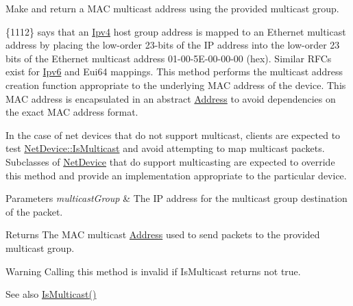 Make and return a M\+AC multicast address using the provided multicast group. 

\{1112\} says that an \hyperlink{classns3_1_1Ipv4}{Ipv4} host group address is mapped to an Ethernet multicast address by placing the low-\/order 23-\/bits of the IP address into the low-\/order 23 bits of the Ethernet multicast address 01-\/00-\/5\+E-\/00-\/00-\/00 (hex). Similar R\+F\+Cs exist for \hyperlink{classns3_1_1Ipv6}{Ipv6} and Eui64 mappings. This method performs the multicast address creation function appropriate to the underlying M\+AC address of the device. This M\+AC address is encapsulated in an abstract \hyperlink{classns3_1_1Address}{Address} to avoid dependencies on the exact M\+AC address format.

In the case of net devices that do not support multicast, clients are expected to test \hyperlink{classns3_1_1NetDevice_a1afb4848a9226540f1ff51f9b31ae95e}{Net\+Device\+::\+Is\+Multicast} and avoid attempting to map multicast packets. Subclasses of \hyperlink{classns3_1_1NetDevice}{Net\+Device} that do support multicasting are expected to override this method and provide an implementation appropriate to the particular device.


\begin{DoxyParams}{Parameters}
{\em multicast\+Group} & The IP address for the multicast group destination of the packet. \\
\hline
\end{DoxyParams}
\begin{DoxyReturn}{Returns}
The M\+AC multicast \hyperlink{classns3_1_1Address}{Address} used to send packets to the provided multicast group.
\end{DoxyReturn}
\begin{DoxyWarning}{Warning}
Calling this method is invalid if Is\+Multicast returns not true. 
\end{DoxyWarning}
\begin{DoxySeeAlso}{See also}
\hyperlink{classns3_1_1NetDevice_a1afb4848a9226540f1ff51f9b31ae95e}{Is\+Multicast()} 
\end{DoxySeeAlso}


